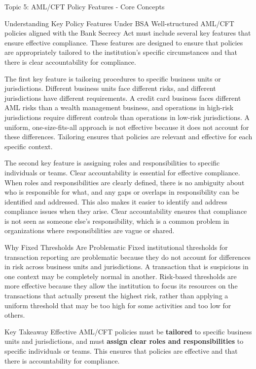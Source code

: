 \documentclass[5pt]{beamer}
\begin{document}
	\begin{frame}{Topic 5: AML/CFT Policy Features - Core Concepts}
		\begin{block}{\tiny Understanding Key Policy Features Under BSA}
			\tiny Well-structured AML/CFT policies aligned with the Bank Secrecy Act must include several key features that ensure effective compliance. These features are designed to ensure that policies are appropriately tailored to the institution's specific circumstances and that there is clear accountability for compliance.
			
			The first key feature is tailoring procedures to specific business units or jurisdictions. Different business units face different risks, and different jurisdictions have different requirements. A credit card business faces different AML risks than a wealth management business, and operations in high-risk jurisdictions require different controls than operations in low-risk jurisdictions. A uniform, one-size-fits-all approach is not effective because it does not account for these differences. Tailoring ensures that policies are relevant and effective for each specific context.
			
			The second key feature is assigning roles and responsibilities to specific individuals or teams. Clear accountability is essential for effective compliance. When roles and responsibilities are clearly defined, there is no ambiguity about who is responsible for what, and any gaps or overlaps in responsibility can be identified and addressed. This also makes it easier to identify and address compliance issues when they arise. Clear accountability ensures that compliance is not seen as someone else's responsibility, which is a common problem in organizations where responsibilities are vague or shared.
		\end{block}
		
		\begin{block}{\tiny Why Fixed Thresholds Are Problematic}
			\tiny Fixed institutional thresholds for transaction reporting are problematic because they do not account for differences in risk across business units and jurisdictions. A transaction that is suspicious in one context may be completely normal in another. Risk-based thresholds are more effective because they allow the institution to focus its resources on the transactions that actually present the highest risk, rather than applying a uniform threshold that may be too high for some activities and too low for others.
		\end{block}
		
		\begin{alertblock}{Key Takeaway}
			\tiny Effective AML/CFT policies must be \textbf{tailored} to specific business units and jurisdictions, and must \textbf{assign clear roles and responsibilities} to specific individuals or teams. This ensures that policies are effective and that there is accountability for compliance.
		\end{alertblock}
	\end{frame}
	
\end{document}
